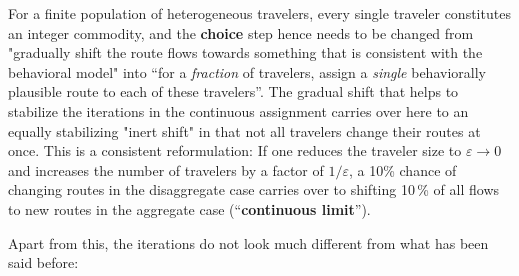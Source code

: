 
%

For a finite population of heterogeneous travelers, every single
traveler constitutes an integer commodity, and the \textbf{choice}
step hence needs to be changed from "gradually shift the route flows
towards something that is consistent with the behavioral model" into
``for a \emph{fraction} of travelers, assign a \emph{single}
behaviorally plausible route to each of these travelers''. The gradual shift that
helps to stabilize the iterations in the continuous assignment carries
over here to an equally stabilizing "inert shift" in that not all travelers
change their routes at once. This is a consistent reformulation: If
one reduces the traveler size to $\varepsilon \rightarrow 0$ and
increases the number of travelers by a factor of $1/\varepsilon$,
a 10\% chance of
changing routes in the disaggregate case carries over to shifting 10\,\%
of all flows to new routes in the aggregate case (``\textbf{continuous
limit}'').

Apart from this, the iterations do not look much different from what
has been said before:

